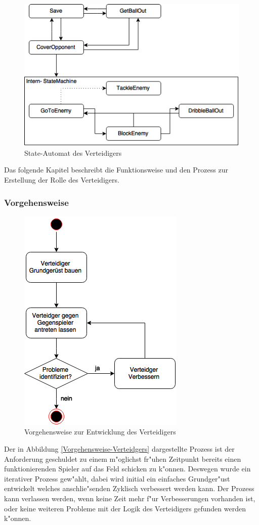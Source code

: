 \begin{figure}[H]
	\centering
	\includegraphics[width=\ScaleIfNeeded]{Grafiken/KI/defender/defender.png}
	\caption{State-Automat des Verteidigers}
	\label{State-Automat des Verteidigers}
\end{figure}
Das folgende Kapitel beschreibt die Funktionsweise und den Prozess zur Erstellung der Rolle des Verteidigers.

\subsubsection{Vorgehensweise}
\begin{figure}[H]
	\centering
	\includegraphics[width=\ScaleIfNeeded]{Grafiken/KI/defender/vorgehensweise.png}
	\caption{Vorgehensweise zur Entwicklung des Verteidigers}
	\label{Vorgehensweise-Verteidigers}
\end{figure}
Der in Abbildung \ref{Vorgehensweise-Verteidgers} dargestellte Prozess ist der Anforderung geschuldet zu einem m"oglichst fr"uhen Zeitpunkt bereits einen funktionierenden Spieler auf das Feld schicken zu k"onnen. Deswegen wurde ein iterativer Prozess gew"ahlt, dabei wird initial ein einfaches Grundger"ust entwickelt welches anschlie"senden Zyklisch verbessert werden kann. Der Prozess kann verlassen werden, wenn keine Zeit mehr f"ur Verbesserungen vorhanden ist, oder keine weiteren Probleme mit der Logik des Verteidigers gefunden werden k"onnen.\\
\\

